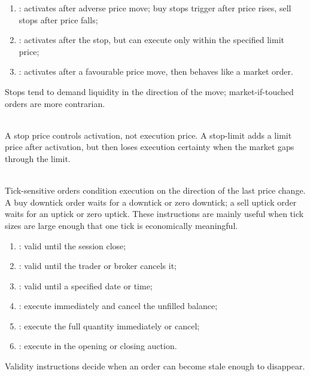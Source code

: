 \documentclass[a4paper,oneside,openany]{book}
\begin{document}
\begin{taxonomy} 
\begin{enumerate}[label=\roman*.]
\setlength{\itemsep}{0pt}
\item {}: activates after adverse price move; buy stops trigger after price rises, sell stops after price falls;
\item {}: activates after the stop, but can execute only within the specified limit price;
\item {}: activates after a favourable price move, then behaves like a market order.
\end{enumerate}
Stops tend to demand liquidity in the direction of the move; market-if-touched orders are more contrarian.
\end{taxonomy}

\begin{caveat} \\
A stop price controls activation, not execution price. A stop-limit adds a limit price after activation, but then loses execution certainty when the market gaps through the limit.
\end{caveat}

\begin{marketrule} \\
Tick-sensitive orders condition execution on the direction of the last price change. A buy downtick order waits for a downtick or zero downtick; a sell uptick order waits for an uptick or zero uptick. These instructions are mainly useful when tick sizes are large enough that one tick is economically meaningful.
\end{marketrule}

\begin{taxonomy} 
\begin{enumerate}[label=\roman*.]
\setlength{\itemsep}{0pt}
\item {}: valid until the session close;
\item {}: valid until the trader or broker cancels it;
\item {}: valid until a specified date or time;
\item {}: execute immediately and cancel the unfilled balance;
\item {}: execute the full quantity immediately or cancel;
\item {}: execute in the opening or closing auction.
\end{enumerate}
Validity instructions decide when an order can become stale enough to disappear.
\end{taxonomy}
\end{document}
